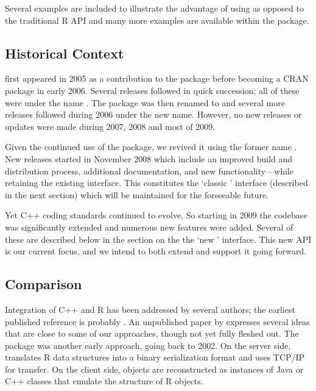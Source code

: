 Several examples are included to 
illustrate the advantage of using  as opposed to 
the traditional R API and many more examples are available within 
the package. 


\subsection{Historical Context}

 first appeared in 2005 as a contribution to the 
package \citep{eddelbuettelkhan09:rquantlib} before becoming a CRAN
package in early 2006. Several releases followed in quick succession; all of
these were under the name . The package was then renamed to
 and several more releases followed during 2006 under the
new name.  However, no new releases or updates were made during 2007, 2008
and most of 2009.

Given the continued use of the package, we revived it using the former name
. New releases started in November 2008 which include an improved
build and distribution process, additional documentation, and new
functionality---while retaining the existing interface.  This constitutes the
`classic ' interface (described in the next section)
which will be maintained for the forseeable future.

Yet C++ coding standards continued to evolve. So starting in 2009 the
codebase was significantly extended and numerous new features were added.
Several of these are described below in the section on the the `new
' interface. This new API is our current focus, and we intend to
both extend and support it going forward.

\subsection{Comparison}

Integration of C++ and R has been addressed by several authors; the earliest
published reference is probably \cite{batesdebroy01:cppclasses}.
An unpublished paper by \cite{javagailemanly07:r_cpp} expresses several ideas
that are close to some of our approaches, though not yet fully fleshed out.
%
The  package \citep{cran:Rserve} was another early approach,
going back to 2002. On the server side,  translates R data
structures into a binary serialization format and uses TCP/IP for
transfer. On the client side, objects are reconstructed as instances of Java
or C++ classes that emulate the structure of R objects. 

